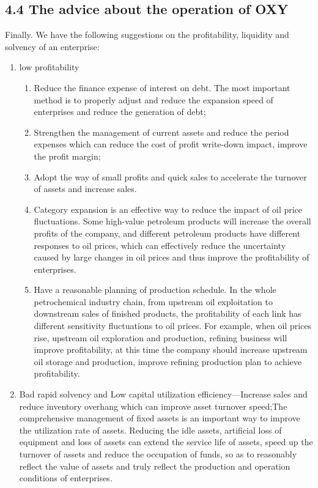 \documentclass[
	a4paper, %
	12pt,%
]{CSSullivanBusinessReport}
\begin{document}
\begin{fullwidth}
\subsection{4.4 The advice about the operation of OXY}
Finally. We have the following suggestions on the profitability, liquidity and solvency of an enterprise: 
\begin{enumerate}
    \item low profitability
    \begin{enumerate}
        \item Reduce the finance expense of interest on debt. The most important method is to properly adjust and reduce the expansion speed of enterprises and reduce the generation of debt;
        \item Strengthen the management of current assets and reduce the period expenses which can reduce the cost of profit write-down impact, improve the profit margin;
        \item Adopt the way of small profits and quick sales to accelerate the turnover of assets and increase sales. 
        \item Category expansion is an effective way to reduce the impact of oil price fluctuations. Some high-value petroleum products will increase the overall profits of the company, and different petroleum products have different responses to oil prices, which can effectively reduce the uncertainty caused by large changes in oil prices and thus improve the profitability of enterprises.
        \item Have a reasonable planning of production schedule. In the whole petrochemical industry chain, from upstream oil exploitation to downstream sales of finished products, the profitability of each link has different sensitivity fluctuations to oil prices. For example, when oil prices rise, upstream oil exploration and production, refining business will improve profitability, at this time the company should increase upstream oil storage and production, improve refining production plan to achieve profitability.
    \end{enumerate}
    \item Bad rapid solvency and Low capital utilization efficiency—Increase sales and reduce inventory overhang which can improve asset turnover speed;The comprehensive management of fixed assets is an important way to improve the utilization rate of assets. Reducing the idle assets, artificial loss of equipment and loss of assets can extend the service life of assets, speed up the turnover of assets and reduce the occupation of funds, so as to reasonably reflect the value of assets and truly reflect the production and operation conditions of enterprises.

\end{enumerate}
\end{fullwidth}
\end{document}
